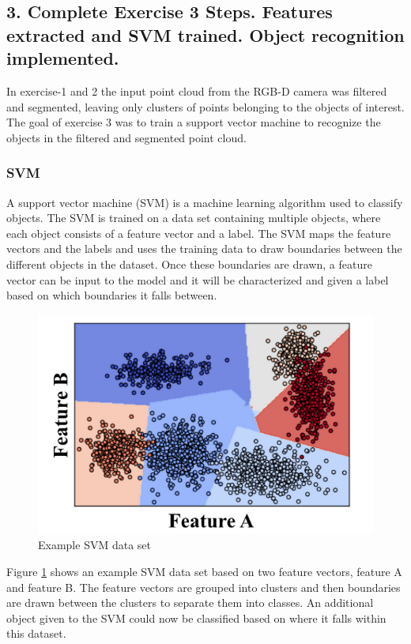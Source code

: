 \documentclass{article}
\begin{document}
\subsection{3. Complete Exercise 3 Steps.  Features extracted and SVM trained.  Object recognition implemented.}
In exercise-1 and 2 the input point cloud from the RGB-D camera was filtered and segmented, leaving only clusters of points belonging to the objects of interest. The goal of exercise 3 was to train a support vector machine to recognize the objects in the filtered and segmented point cloud.

\subsubsection{SVM}
A support vector machine (SVM) is a machine learning algorithm used to classify objects. The SVM is trained on a data set containing multiple objects, where each object consists of a feature vector and a label. The SVM maps the feature vectors and the labels and uses the training data to draw boundaries between the different objects in the dataset. Once these boundaries are drawn, a feature vector can be input to the model and it will be characterized and given a label based on which boundaries it falls between.

\begin{figure}[H]
    \includegraphics[width=\linewidth]{SVMexample.png}
    \caption{Example SVM data set}
    \label{fig:SVMex}
\end{figure}

Figure \ref{fig:SVMex} shows an example SVM data set based on two feature vectors, feature A and feature B. The feature vectors are grouped into clusters and then boundaries are drawn between the clusters to separate them into classes. An additional object given to the SVM could now be classified based on where it falls within this dataset.
\end{document}
